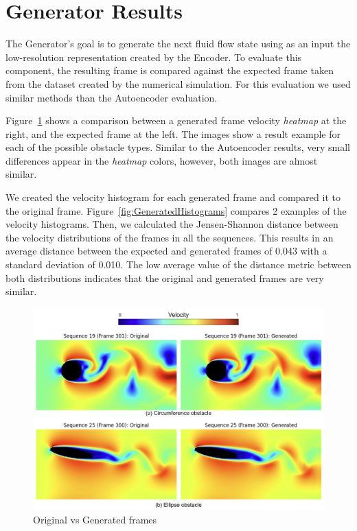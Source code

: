 \section{Generator Results}
\label{sec:GeneratorResults}

The Generator's goal is to generate the next fluid flow state using as an input the low-resolution representation created by the Encoder. To evaluate this component, the resulting frame is compared against the expected frame taken from the dataset created by the numerical simulation. For this evaluation we used similar methods than the Autoencoder evaluation.

Figure~\ref{fig:GeneratedFrames} shows a comparison between a generated frame velocity \textit{heatmap} at the right, and the expected frame at the left. The images show a result example for each of the possible obstacle types. Similar to the Autoencoder results, very small differences appear in the \textit{heatmap} colors, however, both images are almost similar.

We created the velocity histogram for each generated frame and compared it to the original frame. Figure~\ref{fig:GeneratedHistograms} compares 2 examples of the velocity histograms. Then, we calculated the Jensen-Shannon distance between the velocity distributions of the frames in all the sequences. This results in an average distance between the expected and generated frames of 0.043 with a standard deviation of 0.010. The low average value of the distance metric between both distributions indicates that the original and generated frames are very similar.

\begin{figure}[!htbp]
    \centering
    \includegraphics[width=1\linewidth]{images/generator_frames.png}
    \caption{Original vs Generated frames}
    \label{fig:GeneratedFrames}
\end{figure}

